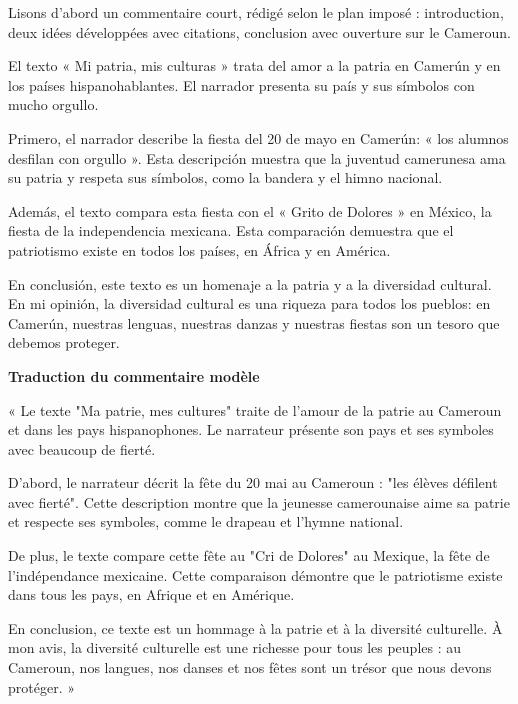 \documentclass[11pt]{article}
\newcounter{popsec}
\newcounter{popsub}
\newcommand{\courssub}[1]{%
  \stepcounter{popsub}%
  \par\vspace{9pt}\noindent{\popxbold\fontsize{11.5}{13}\selectfont\color{popink}{\color{poporange}\thepopsec.\thepopsub}\hspace{6pt}#1}\par\nopagebreak\vspace{4pt}
}
\begin{document}
\courssub{Lecture du commentaire modèle}

Lisons d'abord un commentaire court, rédigé selon le plan imposé : introduction, deux idées développées avec citations, conclusion avec ouverture sur le Cameroun.

\begin{textebox}
El texto « Mi patria, mis culturas » trata del amor a la patria en Camerún y en los países hispanohablantes. El narrador presenta su país y sus símbolos con mucho orgullo.

Primero, el narrador describe la fiesta del 20 de mayo en Camerún: « los alumnos desfilan con orgullo ». Esta descripción muestra que la juventud camerunesa ama su patria y respeta sus símbolos, como la bandera y el himno nacional.

Además, el texto compara esta fiesta con el « Grito de Dolores » en México, la fiesta de la independencia mexicana. Esta comparación demuestra que el patriotismo existe en todos los países, en África y en América.

En conclusión, este texto es un homenaje a la patria y a la diversidad cultural. En mi opinión, la diversidad cultural es una riqueza para todos los pueblos: en Camerún, nuestras lenguas, nuestras danzas y nuestras fiestas son un tesoro que debemos proteger.
\end{textebox}

\textbf{Traduction du commentaire modèle}

« Le texte "Ma patrie, mes cultures" traite de l'amour de la patrie au Cameroun et dans les pays hispanophones. Le narrateur présente son pays et ses symboles avec beaucoup de fierté.

D'abord, le narrateur décrit la fête du 20 mai au Cameroun : "les élèves défilent avec fierté". Cette description montre que la jeunesse camerounaise aime sa patrie et respecte ses symboles, comme le drapeau et l'hymne national.

De plus, le texte compare cette fête au "Cri de Dolores" au Mexique, la fête de l'indépendance mexicaine. Cette comparaison démontre que le patriotisme existe dans tous les pays, en Afrique et en Amérique.

En conclusion, ce texte est un hommage à la patrie et à la diversité culturelle. À mon avis, la diversité culturelle est une richesse pour tous les peuples : au Cameroun, nos langues, nos danses et nos fêtes sont un trésor que nous devons protéger. »
\end{document}
